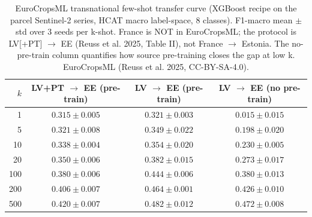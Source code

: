 \begin{table}[t]
\centering
\caption{EuroCropsML transnational few-shot transfer curve (XGBoost recipe on the parcel Sentinel-2 series, HCAT macro label-space, 8 classes). F1-macro mean $\pm$ std over 3 seeds per k-shot. France is NOT in EuroCropsML; the protocol is LV[+PT] $\rightarrow$ EE (Reuss et al. 2025, Table II), not France $\rightarrow$ Estonia. The no-pre-train column quantifies how source pre-training closes the gap at low k. EuroCropsML (Reuss et al. 2025, CC-BY-SA-4.0).}
\label{tab:eurocropsml_kshot}
\begin{tabular}{rccc}
\toprule
$k$ & LV+PT $\rightarrow$ EE (pre-train) & LV $\rightarrow$ EE (pre-train) & LV $\rightarrow$ EE (no pre-train) \\
\midrule
1 & $0.315 \pm 0.005$ & $0.321 \pm 0.003$ & $0.015 \pm 0.015$ \\
5 & $0.321 \pm 0.008$ & $0.349 \pm 0.022$ & $0.198 \pm 0.020$ \\
10 & $0.338 \pm 0.004$ & $0.354 \pm 0.020$ & $0.230 \pm 0.005$ \\
20 & $0.350 \pm 0.006$ & $0.382 \pm 0.015$ & $0.273 \pm 0.017$ \\
100 & $0.380 \pm 0.006$ & $0.444 \pm 0.006$ & $0.380 \pm 0.013$ \\
200 & $0.406 \pm 0.007$ & $0.464 \pm 0.001$ & $0.426 \pm 0.010$ \\
500 & $0.420 \pm 0.007$ & $0.482 \pm 0.012$ & $0.472 \pm 0.008$ \\
\bottomrule
\end{tabular}
\end{table}
